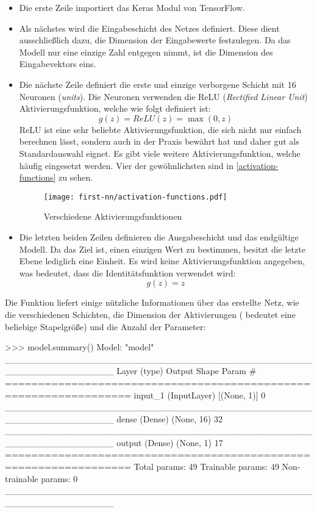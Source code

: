 \begin{itemize}
  \item Die erste Zeile importiert das Keras Modul von TensorFlow.
  \item Als nächstes wird die Eingabeschicht des Netzes definiert.
        Diese dient ausschließlich dazu, die Dimension der Eingabewerte festzulegen.
        Da das Modell nur eine einzige Zahl entgegen nimmt,
        ist die Dimension des Eingabevektors eins.
  \item Die nächste Zeile definiert die erste und einzige verborgene Schicht mit
        16 Neuronen (\textit{units}). Die Neuronen verwenden die ReLU
        (\textit{Rectified Linear Unit}) Aktivierungsfunktion, welche wie folgt
        definiert ist:
        \begin{equation}
          g(z) = ReLU(z) = \max(0, z)
        \end{equation}
        ReLU ist eine sehr beliebte Aktivierungsfunktion, die sich nicht
        nur einfach berechnen lässt, sondern auch in der Praxis bewährt hat
        und daher gut als Standardauswahl eignet. Es gibt viele
        weitere Aktivierungsfunktion, welche häufig eingesetzt werden.
        Vier der gewöhnlichsten sind in \autoref{activation-functions}
        zu sehen.
        \begin{figure}[h!]
          \centering
          \texttt{[image: first-nn/activation-functions.pdf]}
          \caption{Verschiedene Aktivierungsfunktionen \parencite[292]{book:hands-on-ml}}
          \label{activation-functions}
        \end{figure}
  \item Die letzten beiden Zeilen definieren die Ausgabeschicht und das endgültige
        Modell. Da das Ziel ist, einen einzigen Wert zu bestimmen, besitzt die letzte
        Ebene lediglich eine Einheit. Es wird keine Aktivierungsfunktion angegeben,
        was bedeutet, dass die Identitätsfunktion verwendet wird:
        \begin{equation}
          g(z) = z
        \end{equation}
\end{itemize}
Die  Funktion liefert einige nützliche Informationen
über das erstellte Netz, wie die verschiedenen Schichten, die Dimension
der Aktivierungen ( bedeutet eine beliebige Stapelgröße)
und die Anzahl der Parameter:
\begin{pyconcode}
>>> model.summary()
Model: "model"
_________________________________________________________________
Layer (type)                 Output Shape              Param #   
=================================================================
input_1 (InputLayer)         [(None, 1)]               0         
_________________________________________________________________
dense (Dense)                (None, 16)                32        
_________________________________________________________________
output (Dense)               (None, 1)                 17        
=================================================================
Total params: 49
Trainable params: 49
Non-trainable params: 0
_________________________________________________________________
\end{pyconcode}
